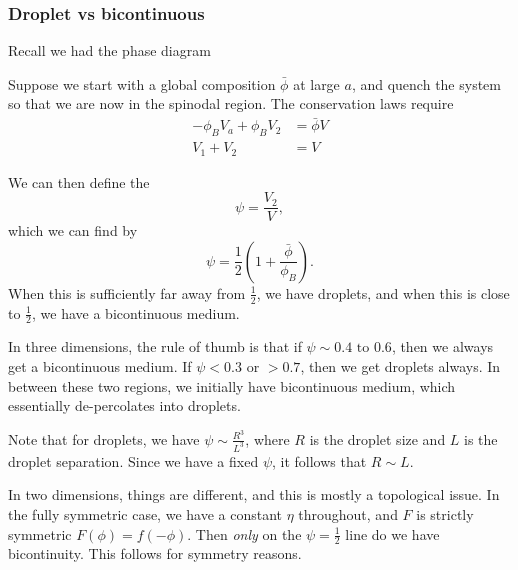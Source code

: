 \documentclass[a4paper]{article}
\begin{document}
\subsubsection*{Droplet vs bicontinuous}
Recall we had the phase diagram
\begin{center}
\end{center}
Suppose we start with a global composition $\bar{\phi}$ at large $a$, and quench the system so that we are now in the spinodal region. The conservation laws require
\begin{align*}
  - \phi_B V_a + \phi_B V_2 &= \bar\phi V\\
  V_1 + V_2 &= V
\end{align*}

We can then define the 
\[
  \psi = \frac{V_2}{ V},
\]
which we can find by
\[
  \psi = \frac{1}{2} \left(1 + \frac{\bar{\phi}}{\phi_B}\right).
\]
When this is sufficiently far away from $\frac{1}{2}$, we have droplets, and when this is close to $\frac{1}{2}$, we have a bicontinuous medium.

In three dimensions, the rule of thumb is that if $\psi \sim 0.4 \text{ to }0.6$, then we always get a bicontinuous medium. If $\psi < 0.3$ or $>0.7$, then we get droplets always. In between these two regions, we initially have bicontinuous medium, which essentially de-percolates into droplets.

Note that for droplets, we have $\psi \sim \frac{R^3}{L^3}$, where $R$ is the droplet size and $L$ is the droplet separation. Since we have a fixed $\psi$, it follows that $R \sim L$.

In two dimensions, things are different, and this is mostly a topological issue. In the fully symmetric case, we have a constant $\eta$ throughout, and $F$ is strictly symmetric $F(\phi) = f(-\phi)$. Then \emph{only} on the $\psi = \frac{1}{2}$ line do we have bicontinuity. This follows for symmetry reasons. %
\end{document}
